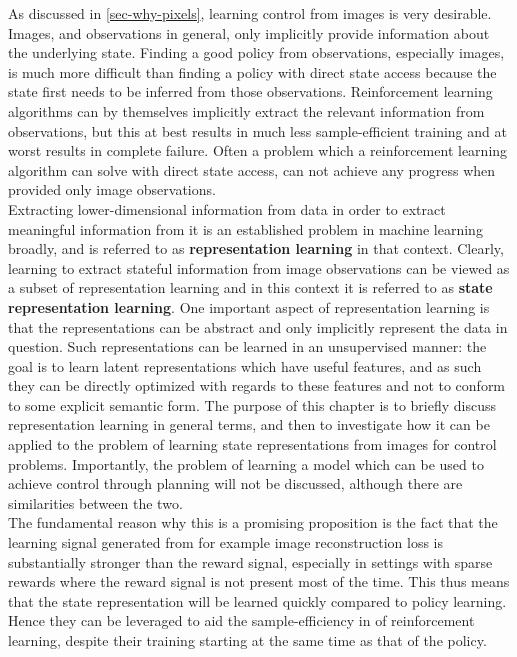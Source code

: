 As discussed in \ref{sec-why-pixels}, learning control from images is 
very desirable. Images, and observations in general, only implicitly 
provide information about the underlying state. 
Finding a good policy from observations, especially images,
is much more difficult than finding a policy with direct state access
because the state first needs to be inferred from those observations.
Reinforcement learning algorithms can by themselves implicitly extract
the relevant information from observations, but this at best results
in much less sample-efficient training and at worst results
in complete failure.
Often a problem which a reinforcement learning algorithm can solve
with direct state access, can not achieve any progress when
provided only image observations. \\

Extracting lower-dimensional information from data in order to extract
meaningful information from it is an established problem in machine learning broadly,
and is referred to as \textbf{representation learning} in that context.
Clearly, learning to extract stateful information from image observations
can be viewed as a subset of representation learning
and in this context it is referred to as \textbf{state representation learning}.
One important aspect of representation learning is that the representations
can be abstract and only implicitly represent the data in question.
Such representations can be learned in an unsupervised manner:
the goal is to learn latent representations which have useful features,
and as such they can be directly optimized with regards to these features
and not to conform to some explicit semantic form.
The purpose of this chapter is to briefly discuss representation learning
in general terms, and then to investigate how it can be applied
to the problem of learning state representations from images for control problems. 
Importantly, the problem of learning a model 
which can be used to achieve control through planning will not be discussed,
although there are similarities between the two.\\

The fundamental reason why this is a promising proposition is
the fact that the learning signal generated from for example
image reconstruction loss is substantially stronger than the reward signal,
especially in settings with sparse rewards where the reward signal is 
not present most of the time.
This thus means that the state representation will be learned quickly
compared to policy learning. Hence they can be leveraged to
aid the sample-efficiency in of reinforcement learning, 
despite their training starting at the same time as that of the policy.

